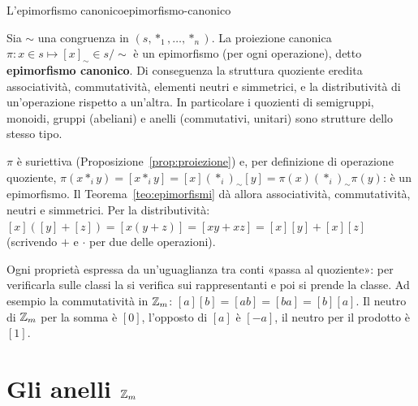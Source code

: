 \begin{concetto}
\begin{Teorema}{L'epimorfismo canonico}{epimorfismo-canonico}
    \begin{prerequisiti}
    \end{prerequisiti}
    Sia $\sim$ una congruenza in $(s, *_1, \dots, *_n)$. La proiezione canonica $\pi \colon x \in s \mapsto [x]_\sim \in s/{\sim}$ è un epimorfismo (per
    ogni operazione), detto \textbf{epimorfismo canonico}. Di conseguenza la struttura quoziente eredita associatività, commutatività,
    elementi neutri e simmetrici, e la distributività di un'operazione rispetto a un'altra. In particolare i quozienti di semigruppi,
    monoidi, gruppi (abeliani) e anelli (commutativi, unitari) sono strutture dello stesso tipo.
\end{Teorema}
\begin{dimostrazione}
    $\pi$ è suriettiva (Proposizione~\ref{prop:proiezione}) e, per definizione di operazione quoziente, $\pi(x *_i y) = [x *_i y] = [x] (*_i)_\sim [y]
    = \pi(x) (*_i)_\sim \pi(y)$: è un epimorfismo. Il Teorema~\ref{teo:epimorfismi} dà allora associatività, commutatività, neutri e simmetrici.
    Per la distributività: $[x]([y] + [z]) = [x(y + z)] = [xy + xz] = [x][y] + [x][z]$ (scrivendo $+$ e $\cdot$ per due delle operazioni).
\end{dimostrazione}
\end{concetto}

\begin{spiegazione}
    Ogni proprietà espressa da un'uguaglianza tra conti «passa al quoziente»: per verificarla sulle classi la si verifica sui
    rappresentanti e poi si prende la classe. Ad esempio la commutatività in $\mathbb{Z}_m$: $[a][b] = [ab] = [ba] = [b][a]$. Il neutro di $\mathbb{Z}_m$
    per la somma è $[0]$, l'opposto di $[a]$ è $[-a]$, il neutro per il prodotto è $[1]$.
\end{spiegazione}

\section{Gli anelli $\mathbb{Z}_m$}\label{sec:anelli-zm}

